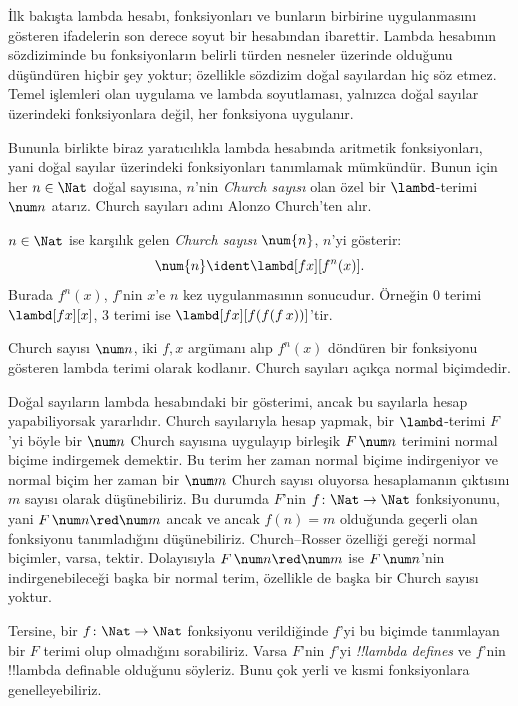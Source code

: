 


İlk bakışta lambda hesabı, fonksiyonları ve bunların birbirine uygulanmasını
gösteren ifadelerin son derece soyut bir hesabından ibarettir. Lambda
hesabının sözdiziminde bu fonksiyonların belirli türden nesneler üzerinde
olduğunu düşündüren hiçbir şey yoktur; özellikle sözdizim doğal sayılardan
hiç söz etmez. Temel işlemleri olan uygulama ve lambda soyutlaması, yalnızca
doğal sayılar üzerindeki fonksiyonlara değil, her fonksiyona uygulanır.

Bununla birlikte biraz yaratıcılıkla lambda hesabında aritmetik fonksiyonları,
yani doğal sayılar üzerindeki fonksiyonları tanımlamak mümkündür. Bunun için
her $n\in\Nat$ doğal sayısına, $n$'nin \emph{Church sayısı} olan özel bir
$\lambd$-terimi $\num n$ atarız. Church sayıları adını Alonzo Church'ten alır.

\begin{defn}
  $n\in\Nat$ ise karşılık gelen \emph{Church sayısı} $\num{n}$, $n$'yi
  gösterir:
  \[
    \num{n} \ident \lambd[fx][f^n(x)].
  \]
  Burada $f^n(x)$, $f$'nin $x$'e $n$ kez uygulanmasının sonucudur. Örneğin
  $\num{0}$ terimi $\lambd[fx][x]$, $\num{3}$ terimi ise
  $\lambd[fx][f(f(f\,x))]$'tir.
\end{defn}

Church sayısı $\num n$, iki $f,x$ argümanı alıp $f^n(x)$ döndüren bir
fonksiyonu gösteren lambda terimi olarak kodlanır. Church sayıları açıkça
normal biçimdedir.

Doğal sayıların lambda hesabındaki bir gösterimi, ancak bu sayılarla hesap
yapabiliyorsak yararlıdır. Church sayılarıyla hesap yapmak, bir
$\lambd$-terimi $F$'yi böyle bir $\num n$ Church sayısına uygulayıp birleşik
$F\,\num n$ terimini normal biçime indirgemek demektir. Bu terim her zaman
normal biçime indirgeniyor ve normal biçim her zaman bir $\num m$ Church
sayısı oluyorsa hesaplamanın çıktısını $m$ sayısı olarak düşünebiliriz. Bu
durumda $F$'nin $f\colon\Nat\to\Nat$ fonksiyonunu, yani
$F\,\num n\red\num m$ ancak ve ancak $f(n)=m$ olduğunda geçerli olan
fonksiyonu tanımladığını düşünebiliriz. Church--Rosser özelliği gereği normal
biçimler, varsa, tektir. Dolayısıyla $F\,\num n\red\num m$ ise
$F\,\num n$'nin indirgenebileceği başka bir normal terim, özellikle de başka
bir Church sayısı yoktur.

Tersine, bir $f\colon\Nat\to\Nat$ fonksiyonu verildiğinde $f$'yi bu biçimde
tanımlayan bir $F$ terimi olup olmadığını sorabiliriz. Varsa $F$'nin $f$'yi
\emph{!!{lambda define}s} ve $f$'nin !!{lambda definable} olduğunu söyleriz.
Bunu çok yerli ve kısmi fonksiyonlara genelleyebiliriz.

